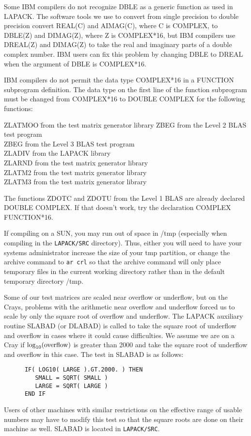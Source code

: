 Some IBM compilers do not recognize DBLE as a generic function as used
in LAPACK.  The software tools we use to convert from single precision
to double precision convert REAL(C) and AIMAG(C), where C is COMPLEX,
to DBLE(Z) and DIMAG(Z), where Z is COMPLEX*16, but
IBM compilers use DREAL(Z) and DIMAG(Z) to take the real and
imaginary parts of a double complex number.
IBM users can fix this problem by changing DBLE to DREAL when the
argument of DBLE is COMPLEX*16.

IBM compilers do not permit the data type COMPLEX*16 in a FUNCTION
subprogram definition.  The data type on the first line of the
function subprogram must be changed from COMPLEX*16 to DOUBLE COMPLEX
for the following functions:

\begin{tabbing}
\dent ZLATMOO \= from the test matrix generator library \kill
\dent ZBEG \> from the Level 2 BLAS test program  \\
\dent ZBEG \> from the Level 3 BLAS test program  \\
\dent ZLADIV \> from the LAPACK library \\
\dent ZLARND \> from the test matrix generator library \\
\dent ZLATM2 \> from the test matrix generator library \\
\dent ZLATM3 \> from the test matrix generator library
\end{tabbing}
The functions ZDOTC and ZDOTU from the Level 1 BLAS are already
declared DOUBLE COMPLEX.  If that doesn't work, try the declaration
COMPLEX FUNCTION*16.

If compiling on a SUN, you may run out of space in /tmp (especially
when compiling in the {\tt LAPACK/SRC} directory).  Thus, either you will
need to have your systems administrator increase the size of your tmp
partition, or change the archive command to {\tt ar crl} so that the
archive command will only place temporary files in the current working
directory rather than in the default temporary directory /tmp.

Some of our test matrices are scaled near overflow or underflow,
but on the Crays, problems with the arithmetic near overflow and
underflow forced us to scale by only the square root of overflow
and underflow. 
The LAPACK auxiliary routine SLABAD (or DLABAD) is called to
take the square root of underflow and overflow in cases where it
could cause difficulties.
We assume we are on a Cray if $ \log_{10} ({\rm overflow})$
is greater than 2000
and take the square root of underflow and overflow in this case.
The test in SLABAD is as follows:
\begin{verbatim}
      IF( LOG10( LARGE ).GT.2000. ) THEN
         SMALL = SQRT( SMALL )
         LARGE = SQRT( LARGE )
      END IF
\end{verbatim}
Users of other machines with similar restrictions on the effective
range of usable numbers may have to modify this test so that the
square roots are done on their machine as well.
SLABAD is located in {\tt LAPACK/SRC}.

